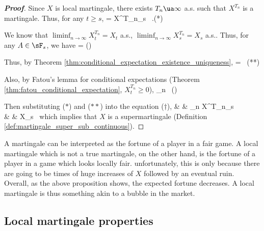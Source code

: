 \begin{proof}[\bf Proof]
Since $X$ is local martingale, there exists $T_n \ua \infty$ a.s. such that $X^{T_n}$ is a martingale. Thus, for any $t\geq s$,
\be
\E{} = X^{T_n}_s \ .\quad \quad (*)
\ee

We know that $\liminf_{n\to \infty} X^{T_n}_t = X_t$ a.s., $\liminf_{n\to \infty} X^{T_n}_s = X_s$ a.s.. Thus, for any $A\in \sF_s$, we have%
\be
\E {} = \E {} \quad ()
\ee

Thus, by Theorem \ref{thm:conditional_expectation_existence_uniqueness},
\be
\E{} = \E{} \ \quad\quad (**)
\ee

Also, by Fatou's lemma for conditional expectations (Theorem \ref{thm:fatou_conditional_expectation}, $X^{T_n}_t\geq 0$),
\be
\E{} \leq \liminf_{n\to \infty} \E{}\ \quad (\dag)
\ee

Then substituting ($*$) and ($**$) into the equation ($\dag$),
\beast
\E{} & \leq & \liminf_{n\to \infty} X^{T_n}_s\ \\
\E{} & \leq & X_s\ 
\eeast
which implies that $X$ is a supermartingale (Definition \ref{def:martingale_super_sub_continuous}).
\end{proof}

\begin{remark}
A martingale can be interpreted as the fortune of a player in a fair game. A local martingale which is not a true martingale, on the other hand, is the fortune of a player in a game which looks locally fair. unfortunately, this is only because there are going to be times of huge increases of $X$ followed by an eventual ruin. Overall, as the above proposition shows, the expected fortune decreases. A local martingale is thus something akin to a bubble in the market.
\end{remark}

\subsection{Local martingale properties}

